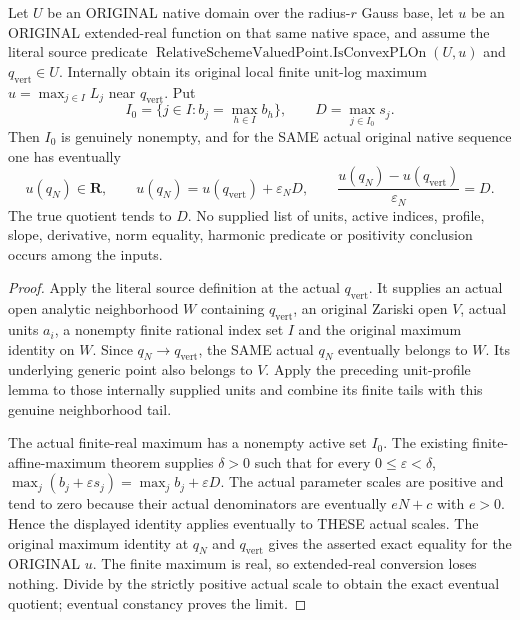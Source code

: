 \begin{theorem}
\label{thm:gauss-native-convex-active-profile}
\leanok
\leavevmode\par
Let $U$ be an ORIGINAL native domain over the radius-$r$ Gauss base, let
$u$ be an ORIGINAL extended-real function on that same native space, and
assume the literal source predicate
$\operatorname{RelativeSchemeValuedPoint.IsConvexPLOn}(U,u)$ and $q_{\mathrm{vert}}\in U$.
Internally obtain its original local finite unit-log maximum
$u=\max_{j\in I}L_j$ near $q_{\mathrm{vert}}$. Put
\[
 I_0=\{j\in I:b_j=\max_{h\in I}b_h\},\qquad
 D=\max_{j\in I_0}s_j.
\]
Then $I_0$ is genuinely nonempty, and for the SAME actual original native
sequence one has eventually
\[
 u(q_N)\in\mathbf R,\qquad
 u(q_N)=u(q_{\mathrm{vert}})+\varepsilon_ND,\qquad
 \frac{u(q_N)-u(q_{\mathrm{vert}})}{\varepsilon_N}=D.
\]
The true quotient tends to $D$. No supplied list of units, active indices,
profile, slope, derivative, norm equality, harmonic predicate or positivity
conclusion occurs among the inputs.
\end{theorem}
\begin{proof}
Apply the literal source definition at the actual $q_{\mathrm{vert}}$. It supplies an
actual open analytic neighborhood $W$ containing $q_{\mathrm{vert}}$, an original Zariski
open $V$, actual units $a_i$, a nonempty finite rational index set $I$ and
the original maximum identity on $W$. Since $q_N\to q_{\mathrm{vert}}$, the SAME actual
$q_N$ eventually belongs to $W$. Its underlying generic point also belongs
to $V$. Apply the preceding unit-profile lemma to those internally supplied
units and combine its finite tails with this genuine neighborhood tail.

The actual finite-real maximum has a nonempty active set $I_0$. The existing
finite-affine-maximum theorem supplies $\delta>0$ such that for every
$0\le\varepsilon<\delta$,
$\max_j(b_j+\varepsilon s_j)=\max_j b_j+\varepsilon D$.
The actual parameter scales are positive and tend to zero because their
actual denominators are eventually $eN+c$ with $e>0$. Hence the displayed
identity applies eventually to THESE actual scales. The original maximum
identity at $q_N$ and $q_{\mathrm{vert}}$ gives the asserted exact equality for the
ORIGINAL $u$. The finite maximum is real, so extended-real conversion loses
nothing. Divide by the strictly positive actual scale to obtain the exact
eventual quotient; eventual constancy proves the limit.
\end{proof}

